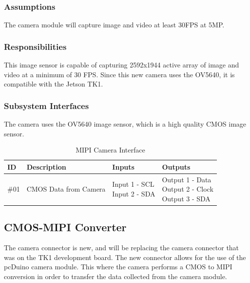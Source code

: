 \subsubsection{Assumptions}
The camera module will capture image and video at least 30FPS at 5MP.

\subsubsection{Responsibilities}
This image sensor is capable of capturing 2592x1944 active array of image and video at a minimum of 30 FPS. Since this new camera uses the OV5640, it is compatible with the Jetson TK1.

\subsubsection{Subsystem Interfaces}

The camera uses the OV5640 image sensor, which is a high quality CMOS image sensor.

\begin {table}[H]
\caption {MIPI Camera Interface}
\begin{center}
    \begin{tabular}{ | p{1cm} | p{6cm} | p{3cm} | p{3cm} |}
    \hline
    ID & Description & Inputs & Outputs \\ \hline
    \#01 & CMOS Data from Camera & \pbox{3cm}{Input 1 - SCL \\ Input 2 - SDA} & \pbox{3cm}{Output 1 - Data \\ Output 2 - Clock \\ Output 3 - SDA}  \\ \hline
    \end{tabular}
\end{center}
\end{table}
\newline

\subsection{CMOS-MIPI Converter}
The camera connector is new, and will be replacing the camera connector that was on the TK1 development board. The new connector allows for the use of the pcDuino camera module. This where the camera performs a CMOS to MIPI conversion in order to transfer the data collected from the camera module.

